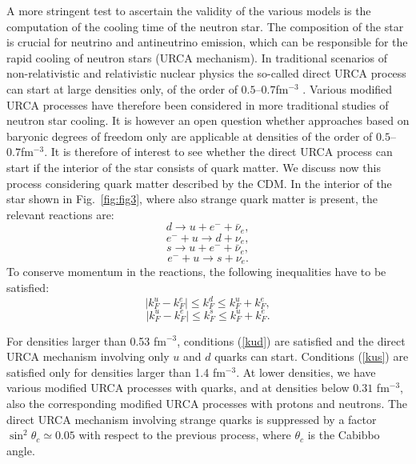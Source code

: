 A more stringent test to ascertain the validity of the various models
is the computation of the cooling time of the neutron star.
The composition of the star is crucial for
neutrino and antineutrino emission,
which can be responsible for the rapid cooling of neutron stars (URCA
mechanism). 
In traditional scenarios of non-relativistic and relativistic 
nuclear physics the 
so-called direct URCA process can start at large densities only, of the
order of $0.5$--$0.7$fm$^{-3}$ \cite{behoo94,elg96}. 
Various modified URCA processes have therefore been considered in 
more traditional studies
of neutron star cooling. 
It is however an
open question
whether approaches based on baryonic
degrees of freedom  only are applicable at densities
of the order of $0.5$--$0.7$fm$^{-3}$.
It is therefore of interest to see whether the direct URCA process
can start if the interior of the star consists of quark matter.
We discuss now this process considering quark matter
described by the CDM.
In the interior of the star shown in 
Fig.\ \ref{fig:fig3}, where also strange quark matter
is present, the relevant reactions are:
\begin{equation}
     d\rightarrow u + e^- + \bar\nu_e,
\end{equation}
\begin{equation}
     e^- + u \rightarrow  d + \nu_e, 
\end{equation}
\begin{equation}
     s\rightarrow u + e^- + \bar\nu_e, 
\end{equation}
\begin{equation}
     e^- + u \rightarrow  s + \nu_e .
\end{equation}
To conserve momentum in the reactions, the following inequalities have to
be satisfied:
\begin{equation}
    \label{kud}
    \vert k_F^u - k_F^e \vert \leq k_F^d \leq  k_F^u + k_F^e,
\end{equation}   
\begin{equation}
    \vert k_F^u - k_F^e \vert \leq  k_F^s \leq  k_F^u + k_F^e. 
    \label{kus}
\end{equation}   

For densities larger than 0.53 fm$^{-3}$, 
conditions (\ref{kud}) are satisfied
and the direct URCA mechanism involving only $u$ and $d$ quarks can start. 
Conditions (\ref{kus}) are satisfied
only for densities larger than 1.4 fm$^{-3}$. 
At lower densities, we have various modified URCA processes with quarks,
and at densities below $0.31$ fm$^{-3}$, also 
the corresponding modified URCA processes with protons and neutrons.
The direct URCA mechanism
involving strange quarks is 
suppressed by a factor $\sin ^2\theta_c\simeq 0.05$ with respect to the
previous process,
where $\theta_c$ is the Cabibbo angle.

